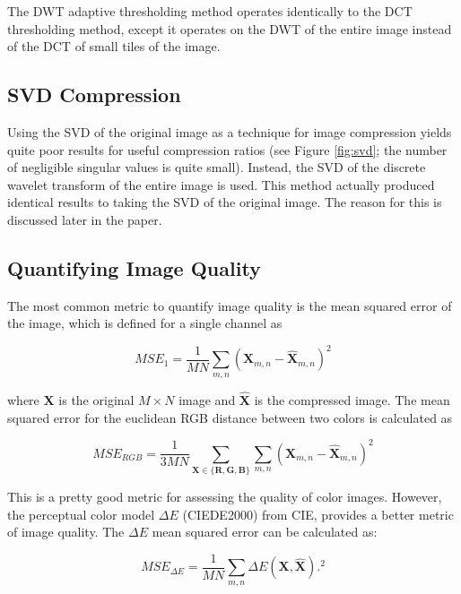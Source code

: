 \documentclass[conference]{IEEEtran}
\begin{document}
The DWT adaptive thresholding method operates identically to the DCT thresholding method, except it operates on the DWT of the entire image instead of the DCT of small tiles of the image.

\subsection{SVD Compression}
Using the SVD of the original image as a technique for image compression yields quite poor results for useful compression ratios (see Figure \ref{fig:svd}; the number of negligible singular values is quite small).
Instead, the SVD of the discrete wavelet transform of the entire image is used.
This method actually produced identical results to taking the SVD of the original image.
The reason for this is discussed later in the paper.

\subsection{Quantifying Image Quality}

The most common metric to quantify image quality is the mean squared error of the image, which is defined for a single channel as

\begin{equation}
    MSE_{1} = \frac{1}{MN}\sum_{m,n}\left(\mathbf{X}_{m,n} - \mathbf{\hat{X}}_{m,n}\right)^2
\end{equation}

where $\mathbf{X}$ is the original $M\times N$ image and $\mathbf{\hat{X}}$ is the compressed image.
The mean squared error for the euclidean RGB distance between two colors is calculated as

\begin{equation}
    MSE_{RGB} = \frac{1}{3MN}\sum_{\mathbf{X}\in\{\mathbf{R},\mathbf{G},\mathbf{B}\}}\sum_{m,n}\left(\mathbf{X}_{m,n} - \mathbf{\hat{X}}_{m,n}\right)^2
\end{equation}

This is a pretty good metric for assessing the quality of color images.
However, the perceptual color model $\Delta E$ (CIEDE2000) from CIE, provides a better metric of image quality.
The $\Delta E$ mean squared error can be calculated as:

\begin{equation}
    MSE_{\Delta E} = \frac{1}{MN}\sum_{m,n}\Delta E\left(\mathbf{X}, \mathbf{\hat{X}}\right).^2
\end{equation}
\end{document}
